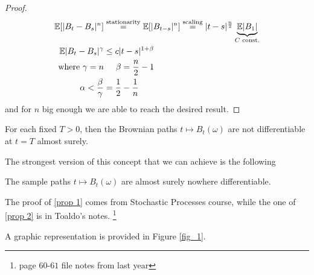 \begin{ProofBox}
    \begin{proof}
    \begin{equation*}
    \begin{split}
    \mathbb{E}[|B_t - B_s|^n] &\stackrel{ \text{stationarity}} = \mathbb{E}[|B_{t-s}|^n] \stackrel{ \text{scaling}} = |t-s|^\frac{n}{2} \underbrace{\mathbb{E}|B_1|}_{C \text{ const.}}\\
        \mathbb{E} |B_t -B_s|^\gamma &\leq c |t-s|^{1+\beta}\\
        \text{ where }\gamma= n &\hspace{0.5 cm} \beta=  \frac{n}{2}-1\\
        \alpha < \frac{\beta}{\gamma}&= \frac{1}{2}-\frac{1}{n} \hspace{1 cm}
    \end{split}      
    \end{equation*}
    and for $n$ big enough we are able to reach the desired result.
\end{proof}
\end{ProofBox}
\begin{PropBox}
    \begin{Proposition}
\label{prop 1}
    For each fixed $T > 0$, then the Brownian paths $t \mapsto B_t(\omega)$ are not differentiable at $t=T$ almost surely. 
\end{Proposition}
\end{PropBox}
The strongest version of this concept that we can achieve is the following 
\begin{PropBox}
    \begin{Proposition}
\label{prop 2}
    The sample paths $t \mapsto B_t(\omega)$ are almost surely nowhere differentiable. 
\end{Proposition}
\end{PropBox}
The proof of \eqref{prop 1} comes from Stochastic Processes course, while the one of \eqref{prop 2} is in Toaldo's notes. \footnote{page $60$-$61$ file notes from last year}

A graphic representation is provided in Figure \ref{fig_1}. 

